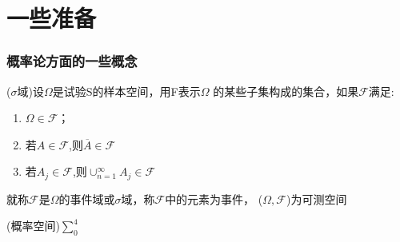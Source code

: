 \part{一些准备}
\section{概率论方面的一些概念}
\begin{定义}
($\sigma$域)设$\Omega$是试验S的样本空间，用F表示$\Omega$
的某些子集构成的集合，如果$\mathscr{F}$满足:
\begin{enumerate}
\item $\Omega \in \mathscr{F}$；
\item 若$A\in \mathscr{F}$,则$\overline{A}\in \mathscr{F}$
\item 若$A_j\in \mathscr{F}$,则$\cup^{\infty}_{n=1}A_j\in \mathscr{F}$
\end{enumerate}
就称$\mathscr{F}$是$\Omega$的事件域或$\sigma$域，称$\mathscr{F}$中的元素为事件，
($\Omega,\mathscr{F}$)为可测空间
\end{定义}
\begin{定义}
(概率空间)$\sum_{0}^{4}$
\end{定义}
